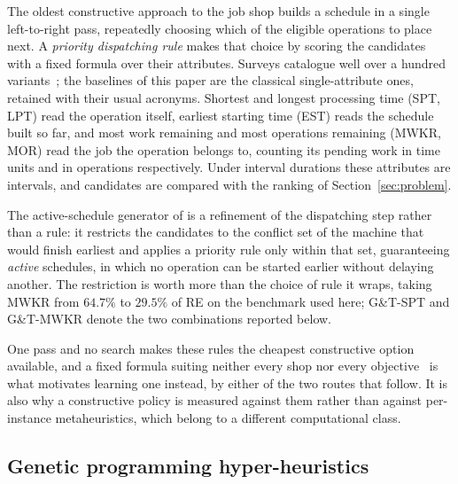 \documentclass[preprint,12pt]{elsarticle}
\theoremstyle{definition}
\theoremstyle{remark}
\begin{document}
The oldest constructive approach to the job shop builds a schedule in
a single left-to-right pass, repeatedly choosing which of the eligible
operations to place next. A \emph{priority dispatching rule} makes
that choice by scoring the candidates with a fixed formula over their
attributes. Surveys catalogue well over a hundred
variants~\citep{Panwalkar1977,Haupt1989,Durasevic2018}; the baselines
of this paper are the classical single-attribute ones, retained with
their usual acronyms. Shortest and longest processing time (SPT, LPT)
read the operation itself, earliest starting time (EST) reads the
schedule built so far, and most work remaining and most operations
remaining (MWKR, MOR) read the job the operation belongs to, counting
its pending work in time units and in operations respectively. Under
interval durations these attributes are intervals, and candidates are
compared with the ranking of Section~\ref{sec:problem}.

The active-schedule generator of \citet{GifflerThompson1960} is a
refinement of the dispatching step rather than a rule: it restricts
the candidates to the conflict set of the machine that would finish
earliest and applies a priority rule only within that set,
guaranteeing \emph{active} schedules, in which no operation can be
started earlier without delaying another. The restriction is worth
more than the choice of rule it wraps, taking MWKR from $64.7\%$ to
$29.5\%$ of RE on the benchmark used here; G\&T-SPT and G\&T-MWKR
denote the two combinations reported below.

One pass and no search makes these rules the cheapest constructive
option available, and a fixed formula suiting neither every shop nor
every objective~\citep{Haupt1989} is what motivates learning one
instead, by either of the two routes that follow. It is also why a
constructive policy is measured against them rather than against
per-instance metaheuristics, which belong to a different
computational class.

\subsection{Genetic programming hyper-heuristics}
\label{sec:related-gp}
\end{document}
